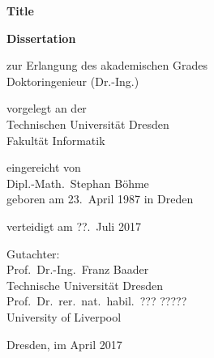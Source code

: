 \pagestyle{empty}

\begin{titlepage}
    \begin{center}
        \textbf{\textsf{\huge Title}}\\
        \bigskip\bigskip\bigskip


        \Large
        \textbf{Dissertation}\\
        \bigskip\bigskip

        zur Erlangung des akademischen Grades\\
        Doktoringenieur (Dr.-Ing.)\\
        \bigskip\bigskip

        vorgelegt an der\\
        Technischen Universität Dresden\\
        Fakultät Informatik\\
        \bigskip\bigskip

        eingereicht von\\
        Dipl.-Math.\ Stephan Böhme\\
        geboren am 23.\ April 1987 in Dreden\\
        \bigskip\bigskip

        verteidigt am {??.\ Juli 2017}\\
        \vfill

        Gutachter:\\
        Prof.\ Dr.-Ing.\ Franz Baader\\
        Technische Universität Dresden\\[1ex]
        Prof.\ Dr.\ rer.\ nat.\ habil.\ ??? ?????\\
        University of Liverpool

        \bigskip\bigskip

        Dresden, im April 2017
    \end{center}
\end{titlepage}

\cleardoublepage

\pagestyle{scrheadings}


\tableofcontents
